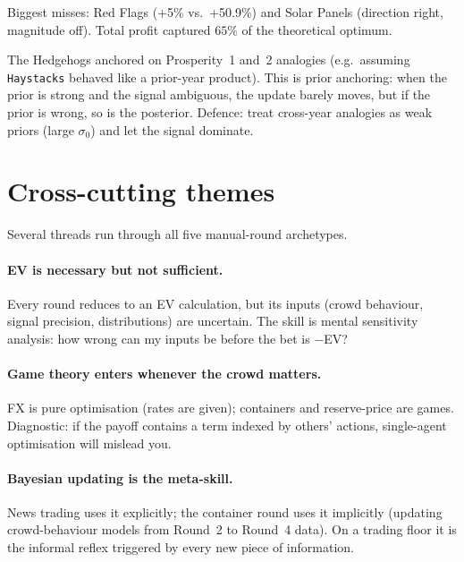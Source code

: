 \noindent
Biggest misses: Red Flags (+5\% vs.\ +50.9\%) and Solar Panels
(direction right, magnitude off).  Total profit captured $65\%$
of the theoretical optimum.

\begin{pitfallbox}
The Hedgehogs anchored on Prosperity~1 and~2 analogies (e.g.\
assuming \texttt{Haystacks} behaved like a prior-year product).
This is prior anchoring: when the prior is strong and the signal
ambiguous, the update barely moves, but if the prior is wrong,
so is the posterior.  Defence: treat cross-year analogies as weak
priors (large $\sigma_0$) and let the signal dominate.
\end{pitfallbox}


\section{Cross-cutting themes}
\label{sec:ch25_cross_cutting}

Several threads run through all five manual-round archetypes.

\paragraph{EV is necessary but not sufficient.}
Every round reduces to an EV calculation, but its inputs (crowd
behaviour, signal precision, distributions) are uncertain.  The
skill is mental sensitivity analysis: how wrong can my inputs be
before the bet is $-$EV?

\paragraph{Game theory enters whenever the crowd matters.}
FX is pure optimisation (rates are given); containers and
reserve-price are games.  Diagnostic: if the payoff contains a
term indexed by others' actions, single-agent optimisation will
mislead you.

\paragraph{Bayesian updating is the meta-skill.}
News trading uses it explicitly; the container round uses it
implicitly (updating crowd-behaviour models from Round~2 to
Round~4 data).  On a trading floor it is the informal reflex
triggered by every new piece of information.

